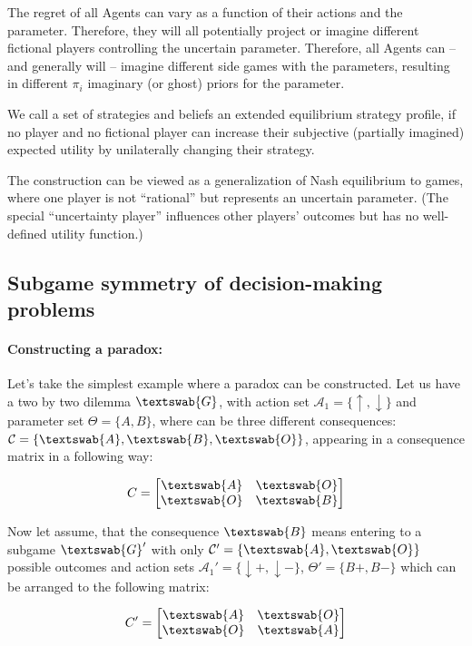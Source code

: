 \documentclass{article}
\begin{document}
The regret of all Agents can vary as a function of their actions and the parameter. Therefore, they will all potentially project or imagine different fictional players controlling the uncertain parameter.
Therefore, all Agents can -- and generally will -- imagine different side games with the parameters, resulting in different $\pi_i$ imaginary (or ghost) priors for the parameter.

We call a set of strategies and beliefs an extended equilibrium strategy profile, if no player and no fictional player can increase their subjective (partially imagined) expected utility by unilaterally changing their strategy.

The construction can be viewed as a generalization of Nash equilibrium to games, where one player is not ``rational'' but represents an uncertain parameter. (The special ``uncertainty player'' influences other players' outcomes but has no well-defined utility function.)

\subsection*{Subgame symmetry of decision-making problems}

\paragraph{Constructing a paradox:}

Let's take the simplest example where a paradox can be constructed.
Let us have a two by two dilemma $\textswab{G}$, with action set $\mathcal{A}_1 = \{\uparrow,\downarrow\}$ and parameter set $\Theta=\{A,B\}$, where can be three different consequences: $\mathcal{C}=\{\textswab{A},\textswab{B},\textswab{O}\}$, appearing in a consequence matrix in a following way:

\[
C=
\begin{bmatrix}
\textswab{A} & \textswab{O} \\
\textswab{O} & \textswab{B}
\end{bmatrix}
\]

Now let assume, that the consequence $\textswab{B}$ means entering to a subgame $\textswab{G}'$ with only $\mathcal{C}'=\{\textswab{A},\textswab{O}\}$ possible outcomes and action sets $\mathcal{A}_1'=\{\downarrow+,\downarrow-\}$, $\Theta'=\{B+,B-\}$ which can be arranged to the following matrix:

\[
C'=
\begin{bmatrix}
\textswab{A} & \textswab{O} \\
\textswab{O} & \textswab{A}
\end{bmatrix}
\]
\end{document}
